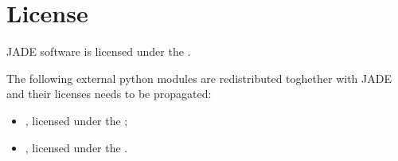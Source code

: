 \documentclass[letterpaper,10pt,english]{sphinxmanual}
\begin{document}
\chapter{License}
\label{\detokenize{LICENSE:license}}\label{\detokenize{LICENSE::doc}}
JADE software is licensed under the {\hyperref[\detokenize{LICENSE:gnulicense}]{}}.

The following external python modules are re\sphinxhyphen{}distributed toghether with
JADE and their licenses needs to be propagated:
\begin{itemize}
\item {} 
, licensed under the {\hyperref[\detokenize{LICENSE:gnulicense}]{}};

\item {} 
, licensed under the {\hyperref[\detokenize{LICENSE:pynelicense}]{}}.

\end{itemize}
\end{document}
